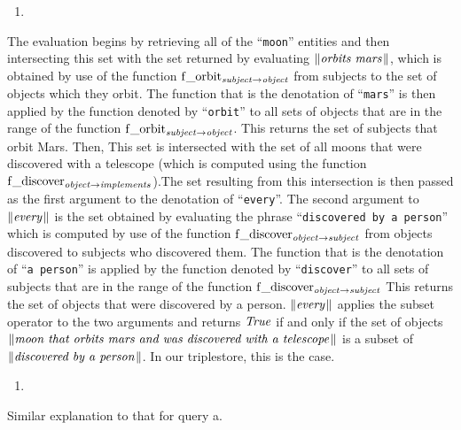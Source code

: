 \documentclass[../main.tex]{subfiles}
\begin{document}
\begin{refsection}
\begin{enumerate}[before=\small, label=\alph*.]
	\setlength\itemsep{0em}
	\item {}
\end{enumerate}
The evaluation begins by retrieving all of the ``\texttt{moon}'' entities and then
intersecting this set with the set returned by evaluating $\lVert\textit{orbits mars\hspace{0.1em}}\rVert$, which is obtained by use of the
function $\operatorname{f\_orbit}_{\operatorname{\mathit{subject}} \rightarrow \operatorname{\mathit{object}}}$ from subjects to the set of objects which they orbit. The function that is the
denotation of ``\texttt{mars}'' is then applied by the function denoted by ``\texttt{orbit}'' to all sets of objects that are in
the range of the function $\operatorname{f\_orbit}_{\operatorname{\mathit{subject}} \rightarrow \operatorname{\mathit{object}}}$. This returns the set of subjects that orbit Mars. Then, This set is
intersected with the set of all moons that were discovered with a telescope (which is computed using
the function $\operatorname{f\_discover}_{\operatorname{\mathit{object}} \rightarrow \operatorname{\mathit{implements}}}$).The set resulting from this intersection is then passed as the first
argument to the denotation of ``\texttt{every}''. The second argument to $\lVert\textit{every\hspace{0.1em}}\rVert$ is the set obtained by
evaluating the phrase ``\texttt{discovered by a person}'' which is computed by use of the function $\operatorname{f\_discover}_{\operatorname{\mathit{object}} \rightarrow \operatorname{\mathit{subject}}}$ from objects discovered to subjects who discovered them. The function that is the denotation of ``\texttt{a
person}'' is applied by the function denoted by ``\texttt{discover}'' to all sets of subjects that are in the range of
the function $\operatorname{f\_discover}_{\operatorname{\mathit{object}} \rightarrow \operatorname{\mathit{subject}}}$ This returns the set of objects that were discovered by a person.
$\lVert\textit{every\hspace{0.1em}}\rVert$ applies the subset operator to the two arguments and returns $\operatorname{\mathit{True}}$ if and only if the set of objects
$\lVert\textit{moon that orbits mars and was discovered with a telescope\hspace{0.1em}}\rVert$ is a subset of $\lVert\textit{discovered by a person\hspace{0.1em}}\rVert$. In
our triplestore, this is the case.
\begin{enumerate}[before=\small, label=\alph*.]
	\setlength\itemsep{0em}
	\setcounter{enumi}{1}
	\item {}
\end{enumerate}
\noindent Similar explanation to that for query a.

\end{refsection}
\end{document}

